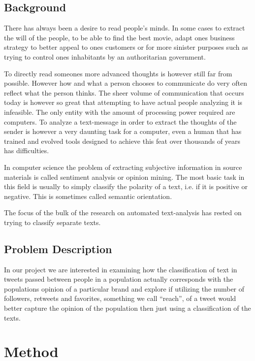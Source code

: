 \documentclass[a4paper,12pt]{report}
\begin{document}
\section{Background}

There has always been a desire to read people's minds.
In some cases to extract the will of the people, to be able to find the best movie, adapt ones business strategy to better appeal to ones customers or for more sinister purposes such as trying to control ones inhabitants by an authoritarian government.

To directly read someones more advanced thoughts is however still far from possible.
However how and what a person chooses to communicate do very often reflect what the person thinks.
The sheer volume of communication that occurs today is however so great that attempting to have actual people analyzing it is infeasible. 
The only entity with the amount of processing power required are computers. 
To analyze a text-message in order to extract the thoughts of the sender is however a very daunting task for a computer, even a human that has trained and evolved tools designed to achieve this feat over thousands of years has difficulties.

In computer science the problem of extracting subjective information in source materials is called sentiment analysis or opinion mining. 
The most basic task in this field is usually to simply classify the polarity of a text, i.e. if it is positive or negative. 
This is sometimes called semantic orientation. 

The focus of the bulk of the research on automated text-analysis has rested on trying to classify separate texts.

\section{Problem Description}

In our project we are interested in examining how the classification of text in tweets passed between people in a population actually corresponds with the populations opinion of a particular brand and explore if utilizing the number of followers, retweets and favorites, something we call ``reach'', of a tweet would better capture the opinion of the population then just using a classification of the texts. 

\chapter{Method}
\end{document}
